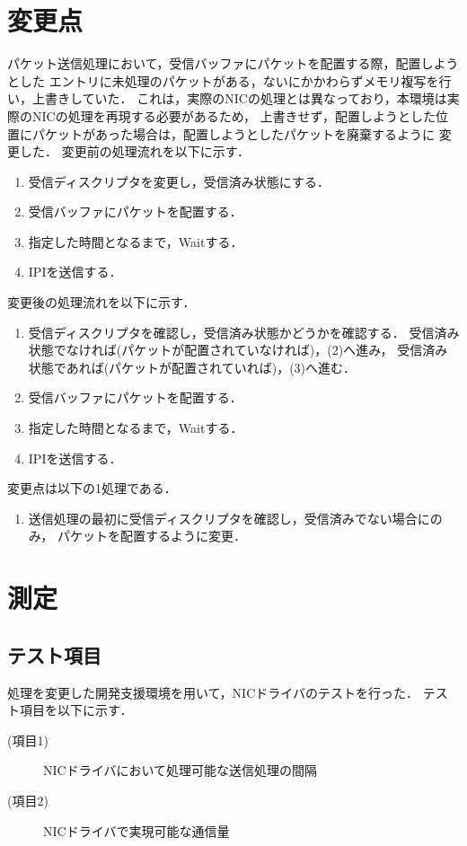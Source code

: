 \documentclass[12pt]{jsarticle}
\begin{document}
\section{変更点}
パケット送信処理において，受信バッファにパケットを配置する際，配置しようとした
エントリに未処理のパケットがある，ないにかかわらずメモリ複写を行い，上書きしていた．
これは，実際のNICの処理とは異なっており，本環境は実際のNICの処理を再現する必要があるため，
上書きせず，配置しようとした位置にパケットがあった場合は，配置しようとしたパケットを廃棄するように
変更した．
変更前の処理流れを以下に示す．
\begin{enumerate}
    \item 受信ディスクリプタを変更し，受信済み状態にする．
    \item 受信バッファにパケットを配置する．
    \item 指定した時間となるまで，Waitする．
    \item IPIを送信する．
\end{enumerate}
変更後の処理流れを以下に示す．
\begin{enumerate}
    \item 受信ディスクリプタを確認し，受信済み状態かどうかを確認する．
        受信済み状態でなければ(パケットが配置されていなければ)，(2)へ進み，
        受信済み状態であれば(パケットが配置されていれば)，(3)へ進む．
    \item 受信バッファにパケットを配置する．
    \item 指定した時間となるまで，Waitする．
    \item IPIを送信する．
\end{enumerate}
変更点は以下の1処理である．
\begin{enumerate}
    \item 送信処理の最初に受信ディスクリプタを確認し，受信済みでない場合にのみ，
        パケットを配置するように変更．
\end{enumerate}

\section{測定}
\subsection{テスト項目}
処理を変更した開発支援環境を用いて，NICドライバのテストを行った．
テスト項目を以下に示す．
\begin{description}
    \item[(項目1)]NICドライバにおいて処理可能な送信処理の間隔
    \item[(項目2)]NICドライバで実現可能な通信量
\end{description}
\end{document}
